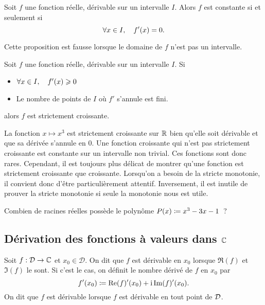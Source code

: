 \documentclass{magnolia}
\begin{document}
\begin{proposition}[utile=3]
Soit $f$ une fonction réelle, dérivable sur un intervalle $I$. Alors $f$ est
constante si et seulement si
\[\forall x\in I ,\quad f'(x)=0.\]
\end{proposition}

\begin{remarqueUnique}
\remarque Cette proposition est fausse lorsque le domaine de 
  $f$ n'est pas un intervalle. 
\end{remarqueUnique}

\begin{proposition}[utile=2]
Soit $f$ une fonction réelle, dérivable sur un intervalle $I$. Si
\begin{itemize}
\item $\forall x\in I ,\quad f'(x)\geqslant 0$
\item Le nombre de points de $I$ où $f'$ s'annule est fini.
\end{itemize}
alors $f$ est strictement croissante.
\end{proposition}

\begin{remarques}
\remarque La fonction $x\mapsto x^3$ est strictement croissante sur $\mathbb{R}$ bien
  qu'elle soit dérivable et que sa dérivée s'annule en 0.
\remarque Une fonction croissante qui n'est pas strictement croissante est constante sur un intervalle non trivial. Ces fonctions sont donc rares. Cependant, il est toujours plus délicat de montrer qu'une fonction est strictement croissante que croissante. Lorsqu'on a besoin de la stricte monotonie, il convient donc d'être particulièrement attentif. Inversement, il est inutile de prouver la stricte monotonie si seule la monotonie nous est utile.
\end{remarques}

\begin{exoUnique}
\exo Combien de racines réelles possède le polynôme $P(x)\coloneqq x^3-3x-1$~?
\end{exoUnique}


\subsection{Dérivation des fonctions à valeurs dans $\mathbb{C}$}

\begin{definition}[utile=-3]
Soit $f:\mathcal{D}\to\mathbb{C}$ et $x_0\in\mathcal{D}$. On dit que $f$ est dérivable en $x_0$ lorsque $\Re(f)$ et $\Im(f)$ le sont. Si c'est le cas, on définit le nombre dérivé de $f$ en $x_0$ par
\[f'(x_0)\coloneqq \mathop{\rm Re}(f)'(x_0)+{\rm i} \mathop{\rm Im}(f)'(x_0).\]
On dit que $f$ est dérivable lorsque $f$ est dérivable en tout point de $\mathcal{D}$.
\end{definition}
\end{document}
